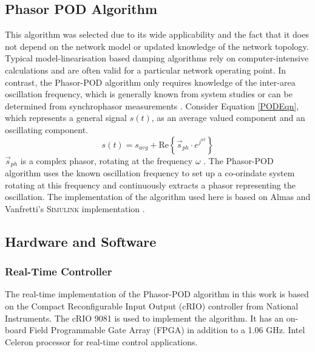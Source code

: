 \documentclass[conference]{IEEEtran}
\begin{document}
\subsection{Phasor POD Algorithm}
This algorithm\cite{PhasorPOD} was selected due to its wide applicability and the fact that it does not depend on the network model or updated knowledge of the network topology. Typical model-linearisation based damping algorithms rely on computer-intensive calculations and are often valid for a particular network operating point. In contrast, the Phasor-POD algorithm only requires knowledge of the inter-area oscillation frequency, which is generally known from system studies or can be determined from synchrophasor measurements \cite{TaskForce}. Consider Equation \ref{PODEqn}, which represents a general signal $s(t)$, as an average valued component and an oscillating component.
\begin{equation}
s(t)={s}_{avg}+\mathrm{Re}\left\{{\stackrel{\to }{s}}_{ph}\cdot {e}^{{j}^{wt}}\right\}
\label{PODEqn}
\end{equation}
 $\stackrel{\to}{s}_{ph}$ is a complex phasor, rotating at the frequency $\omega$ \cite{PhasorPOD}. The Phasor-POD algorithm uses the known oscillation frequency to set up a co-orindate system rotating at this frequency and continuously extracts a phasor representing the oscillation\cite{PhasorPOD}. The implementation of the algorithm used here is based on Almas and Vanfretti's \textsc{Simulink} implementation \cite{PhasorPODImplement}. %

\subsection{Hardware and Software}
\subsubsection*{Real-Time Controller} The real-time implementation of the Phasor-POD algorithm in this work is based on the Compact Reconfigurable Input Output (cRIO) controller from National Instruments. The cRIO 9081 is used to implement the algorithm. It has an on-board Field Programmable Gate Array (FPGA) in addition to a 1.06 GHz. Intel Celeron processor for real-time control applications\cite{cRIO9081}.
\end{document}
